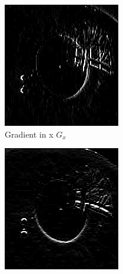 \begin{figure}[ht]
\begin{subfigure}{.33\textwidth}
          \includegraphics[width=.9\linewidth]{plots/eye_dataset/sx.png}
          \caption{Gradient in x \textbf{$G_{x}$}}
          \label{fig:sx}
        \end{subfigure}%
        \begin{subfigure}{.33\textwidth}
          \centering
          \includegraphics[width=.9\linewidth]{plots/eye_dataset/sy.png}

\end{subfigure}
\end{figure}
